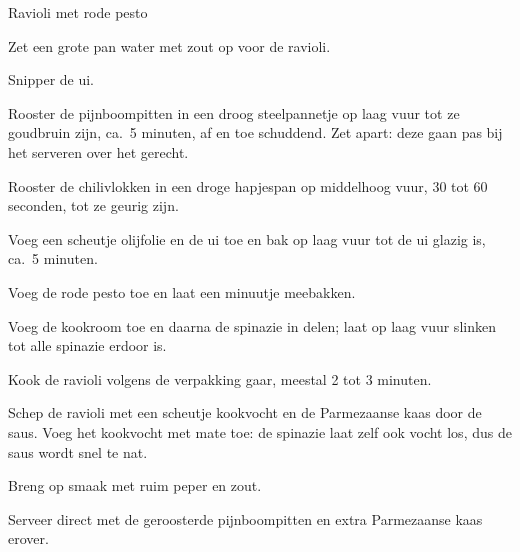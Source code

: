 \begin{recipe}{Ravioli met rode pesto}
\begin{steps}
  \item Zet een grote pan water met zout op voor de ravioli.
  \item Snipper de ui.
  \item Rooster de pijnboompitten in een droog steelpannetje op laag vuur tot
        ze goudbruin zijn, ca.\ 5 minuten, af en toe schuddend. Zet apart:
        deze gaan pas bij het serveren over het gerecht.
  \item Rooster de chilivlokken in een droge hapjespan op middelhoog vuur, 30
        tot 60 seconden, tot ze geurig zijn.
  \item Voeg een scheutje olijfolie en de ui toe en bak op laag vuur tot de ui
        glazig is, ca.\ 5 minuten.
  \item Voeg de rode pesto toe en laat een minuutje meebakken.
  \item Voeg de kookroom toe en daarna de spinazie in delen; laat op laag vuur
        slinken tot alle spinazie erdoor is.
  \item Kook de ravioli volgens de verpakking gaar, meestal 2 tot 3 minuten.
  \item Schep de ravioli met een scheutje kookvocht en de Parmezaanse kaas
        door de saus. Voeg het kookvocht met mate toe: de spinazie laat zelf
        ook vocht los, dus de saus wordt snel te nat.
  \item Breng op smaak met ruim peper en zout.
  \item Serveer direct met de geroosterde pijnboompitten en extra Parmezaanse
        kaas erover.
\end{steps}

\end{recipe}

